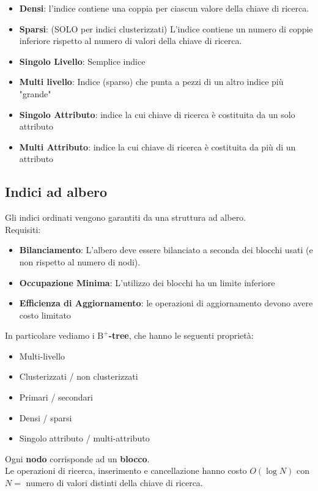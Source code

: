 \hrulefill

\begin{itemize}
    \item \textbf{Densi}: l’indice contiene una coppia per ciascun valore della chiave di ricerca.
    \item \textbf{Sparsi}: (SOLO per indici clusterizzati) L’indice contiene un numero di coppie inferiore rispetto al numero di valori della chiave di ricerca.
\end{itemize}

\hrulefill

\begin{itemize}
    \item \textbf{Singolo Livello}: Semplice indice
    \item \textbf{Multi livello}: Indice (sparso) che punta a pezzi di un altro indice più "grande"
\end{itemize}

\hrulefill

\begin{itemize}
    \item \textbf{Singolo Attributo}: indice la cui chiave di ricerca è costituita da un solo attributo
    \item \textbf{Multi Attributo}: indice la cui chiave di ricerca è costituita da più di un attributo
\end{itemize}

\subsection{Indici ad albero}
Gli indici ordinati vengono garantiti da una struttura ad albero.\\
Requisiti:
\begin{itemize}
    \item \textbf{Bilanciamento}: L'albero deve essere bilanciato a seconda dei blocchi usati (e non rispetto al numero di nodi).
    \item \textbf{Occupazione Minima}: L'utilizzo dei blocchi ha un limite inferiore
    \item \textbf{Efficienza di Aggiornamento}: le operazioni di aggiornamento devono avere costo limitato
\end{itemize}
In particolare vediamo i \textbf{$\text{B}^+$-tree}, che hanno le seguenti proprietà:
\begin{itemize}
    \item Multi-livello
    \item Clusterizzati / non clusterizzati
    \item Primari / secondari
    \item Densi / sparsi
    \item Singolo attributo / multi-attributo
\end{itemize}
Ogni \textbf{nodo} corrisponde ad un \textbf{blocco}.\\
Le operazioni di ricerca, inserimento e cancellazione hanno costo $O(\log N)$ con $N =$ numero di valori distinti della chiave di ricerca.

